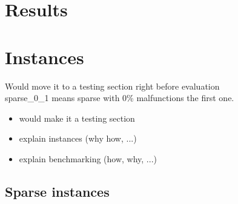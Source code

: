 \documentclass{llncs}
\begin{document}
\section{Results}
\section{Instances}
\color{green} Would move it to a testing section right before evaluation \color{black}\\
sparse\_0\_1 means sparse with 0\% malfunctions the first one.
\color{blue}
\begin{itemize}
	\item would make it a testing section
	\item explain instances (why how, ...)
	\item explain benchmarking (how, why, ...)
\end{itemize}
\color{black}

\subsection{Sparse instances}
\end{document}
